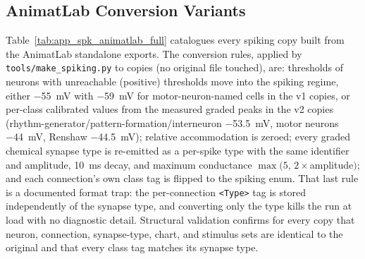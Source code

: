 \subsection{AnimatLab Conversion Variants}

Table~\ref{tab:app_spk_animatlab_full} catalogues every spiking copy built from the AnimatLab standalone exports. The conversion rules, applied by \texttt{tools/make\_spiking.py} to copies (no original file touched), are: thresholds of neurons with unreachable (positive) thresholds move into the spiking regime, either \qty{-55}{\mV} with \qty{-59}{\mV} for motor-neuron-named cells in the v1 copies, or per-class calibrated values from the measured graded peaks in the v2 copies (rhythm-generator/pattern-formation/interneuron \qty{-53.5}{\mV}, motor neurons \qty{-44}{\mV}, Renshaw \qty{-44.5}{\mV}); relative accommodation is zeroed; every graded chemical synapse type is re-emitted as a per-spike type with the same identifier and amplitude, \qty{10}{\ms} decay, and maximum conductance $\max(5,\,2\times$amplitude$)$; and each connection's own class tag is flipped to the spiking enum. That last rule is a documented format trap: the per-connection \texttt{<Type>} tag is stored independently of the synapse type, and converting only the type kills the run at load with no diagnostic detail. Structural validation confirms for every copy that neuron, connection, synapse-type, chart, and stimulus sets are identical to the original and that every class tag matches its synapse type.

